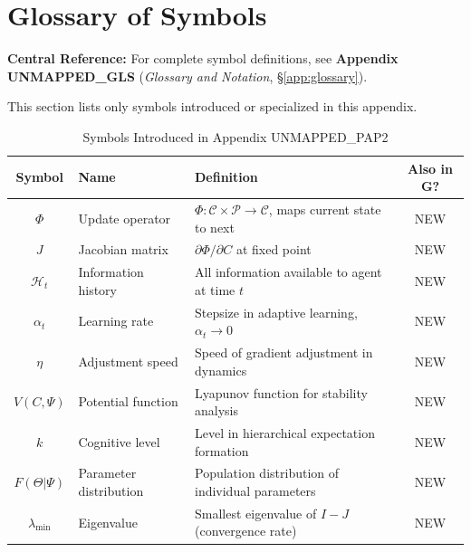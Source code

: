 \section{Glossary of Symbols}
\label{sec:az-glossary}

\begin{tcolorbox}[colback=blue!5!white, colframe=blue!75!black]
\textbf{Central Reference:} For complete symbol definitions, see
\textbf{Appendix UNMAPPED_GLS} (\textit{Glossary and Notation}, \S\ref{app:glossary}).

This section lists only symbols introduced or specialized in this appendix.
\end{tcolorbox}

\vspace{0.5em}

\begin{table}[htbp]
\centering
\caption{Symbols Introduced in Appendix UNMAPPED_PAP2}
\label{tab:az-symbols}
\renewcommand{\arraystretch}{1.3}
\begin{tabular}{@{}clp{6cm}c@{}}
\toprule
\textbf{Symbol} & \textbf{Name} & \textbf{Definition} & \textbf{Also in G?} \\
\midrule
$\Phi$ & Update operator & $\Phi: \mathcal{C} \times \mathcal{P} \to \mathcal{C}$, maps current state to next & NEW \\
$J$ & Jacobian matrix & $\partial \Phi / \partial C$ at fixed point & NEW \\
$\mathcal{H}_t$ & Information history & All information available to agent at time $t$ & NEW \\
$\alpha_t$ & Learning rate & Stepsize in adaptive learning, $\alpha_t \to 0$ & NEW \\
$\eta$ & Adjustment speed & Speed of gradient adjustment in dynamics & NEW \\
$V(C, \Psi)$ & Potential function & Lyapunov function for stability analysis & NEW \\
$k$ & Cognitive level & Level in hierarchical expectation formation & NEW \\
$F(\Theta | \Psi)$ & Parameter distribution & Population distribution of individual parameters & NEW \\
$\lambda_{\min}$ & Eigenvalue & Smallest eigenvalue of $I - J$ (convergence rate) & NEW \\
\bottomrule
\end{tabular}
\end{table}


